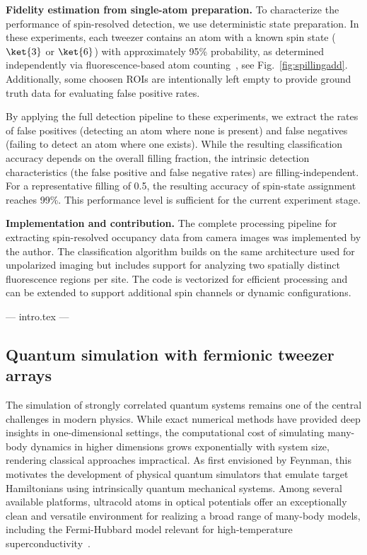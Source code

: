 \textbf{Fidelity estimation from single-atom preparation.}  
To characterize the performance of spin-resolved detection, we use deterministic state preparation. In these experiments, each tweezer contains an atom with a known spin state ($\ket{3}$ or $\ket{6}$) with approximately 95\% probability, as determined independently via fluorescence-based atom counting~\cite{dux_optical_2023}, see Fig.~\ref{fig:spillingadd}. Additionally, some choosen ROIs are intentionally left empty to provide ground truth data for evaluating false positive rates.

By applying the full detection pipeline to these experiments, we extract the rates of false positives (detecting an atom where none is present) and false negatives (failing to detect an atom where one exists). While the resulting classification accuracy depends on the overall filling fraction, the intrinsic detection characteristics (the false positive and false negative rates) are filling-independent. For a representative filling of 0.5, the resulting accuracy of spin-state assignment reaches 99\%. This performance level is sufficient for the current experiment stage.

\textbf{Implementation and contribution.}  
The complete processing pipeline for extracting spin-resolved occupancy data from camera images was implemented by the author. The classification algorithm builds on the same architecture used for unpolarized imaging but includes support for analyzing two spatially distinct fluorescence regions per site. The code is vectorized for efficient processing and can be extended to support additional spin channels or dynamic configurations.



--- intro.tex ---

\subsection{Quantum simulation with fermionic tweezer arrays}

The simulation of strongly correlated quantum systems remains one of the central challenges in modern physics. While exact numerical methods have provided deep insights in one-dimensional settings, the computational cost of simulating many-body dynamics in higher dimensions grows exponentially with system size, rendering classical approaches impractical. As first envisioned by Feynman, this motivates the development of physical quantum simulators that emulate target Hamiltonians using intrinsically quantum mechanical systems. Among several available platforms, ultracold atoms in optical potentials offer an exceptionally clean and versatile environment for realizing a broad range of many-body models, including the Fermi-Hubbard model relevant for high-temperature superconductivity~\cite{esslinger_fermi-hubbard_2010, gross_quantum_2017}.

